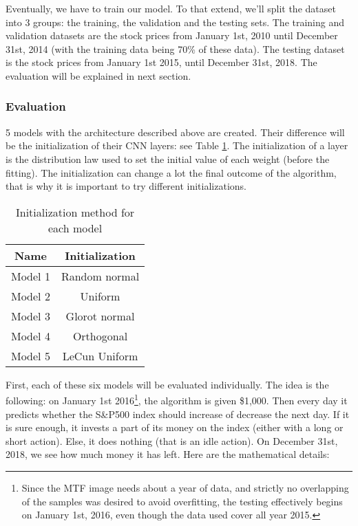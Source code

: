 \documentclass[11pt]{article}
\begin{document}
\begin{onehalfspace}
Eventually, we have to train our model. To that extend, we'll split the dataset into 3 groups: the training, the validation and the testing sets. The training and validation datasets are the stock prices from January 1st, 2010 until December 31st, 2014 (with the training data being 70\% of these data). The testing dataset is the stock prices from January 1st 2015, until December 31st, 2018. The evaluation will be explained in next section.


\subsubsection{Evaluation}
\label{sec:meth_eval}

5 models with the architecture described above are created. Their difference will be the initialization of their CNN layers: see Table \ref{table:initialization}. The initialization of a layer is the distribution law used to set the initial value of each weight (before the fitting). The initialization can change a lot the final outcome of the algorithm, that is why it is important to try different initializations.

\begin{table}[h!]
    \begin{center}
        \begin{tabular}{ | c | c |}
            \hline
            \textbf{Name} & \textbf{Initialization} \\ 
            \hline \hline
            Model 1 & Random normal \\  \hline
            Model 2 & Uniform \\  \hline
            Model 3 & Glorot normal \\  \hline
            Model 4 & Orthogonal \\  \hline
            Model 5 & LeCun Uniform \\  
            \hline
        \end{tabular}
    \end{center}
    \caption{Initialization method for each model}
    \label{table:initialization}
\end{table}

First, each of these six models will be evaluated individually. The idea is the following: on January 1st 2016\footnote{Since the MTF image needs about a year of data, and strictly no overlapping of the samples was desired to avoid overfitting, the testing effectively begins on January 1st, 2016, even though the data used cover all year 2015.}, the algorithm is given \$1,000. Then every day it predicts whether the S\&P500 index should increase of decrease the next day. If it is sure enough, it invests a part of its money on the index (either with a long or short action). Else, it does nothing (that is an idle action). On December 31st, 2018, we see how much money it has left. Here are the mathematical details: 


\end{onehalfspace}
\end{document}
